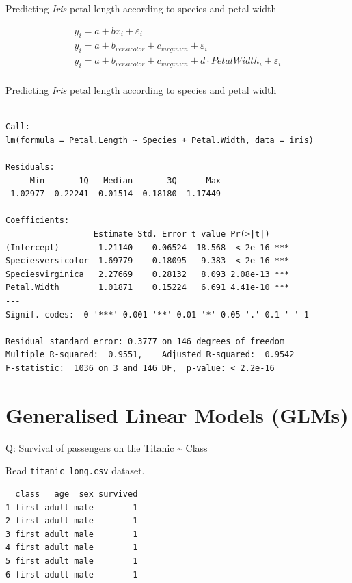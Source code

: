 \documentclass[10pt,ignorenonframetext,]{beamer}
\begin{document}
\begin{frame}{Predicting \emph{Iris} petal length according to species
and petal width}

\[
  \begin{aligned} 
  y_{i}=a+bx_{i}+\varepsilon _{i} \\  
  y_{i}=a+b_{versicolor}+c_{virginica}+\varepsilon _{i} \\   
  y_{i}=a+b_{versicolor}+c_{virginica}+ d \cdot PetalWidth_{i} + \varepsilon _{i} \\   
  \end{aligned} 
\]

\end{frame}

\begin{frame}[fragile]{Predicting \emph{Iris} petal length according to
species and petal width}

\begin{verbatim}

Call:
lm(formula = Petal.Length ~ Species + Petal.Width, data = iris)

Residuals:
     Min       1Q   Median       3Q      Max 
-1.02977 -0.22241 -0.01514  0.18180  1.17449 

Coefficients:
                  Estimate Std. Error t value Pr(>|t|)    
(Intercept)        1.21140    0.06524  18.568  < 2e-16 ***
Speciesversicolor  1.69779    0.18095   9.383  < 2e-16 ***
Speciesvirginica   2.27669    0.28132   8.093 2.08e-13 ***
Petal.Width        1.01871    0.15224   6.691 4.41e-10 ***
---
Signif. codes:  0 '***' 0.001 '**' 0.01 '*' 0.05 '.' 0.1 ' ' 1

Residual standard error: 0.3777 on 146 degrees of freedom
Multiple R-squared:  0.9551,    Adjusted R-squared:  0.9542 
F-statistic:  1036 on 3 and 146 DF,  p-value: < 2.2e-16
\end{verbatim}

\end{frame}

\section{Generalised Linear Models
(GLMs)}\label{generalised-linear-models-glms}

\begin{frame}[fragile]{Q: Survival of passengers on the Titanic
\textasciitilde{} Class}

Read \texttt{titanic\_long.csv} dataset.

\begin{verbatim}
  class   age  sex survived
1 first adult male        1
2 first adult male        1
3 first adult male        1
4 first adult male        1
5 first adult male        1
6 first adult male        1
\end{verbatim}

\end{frame}
\end{document}
